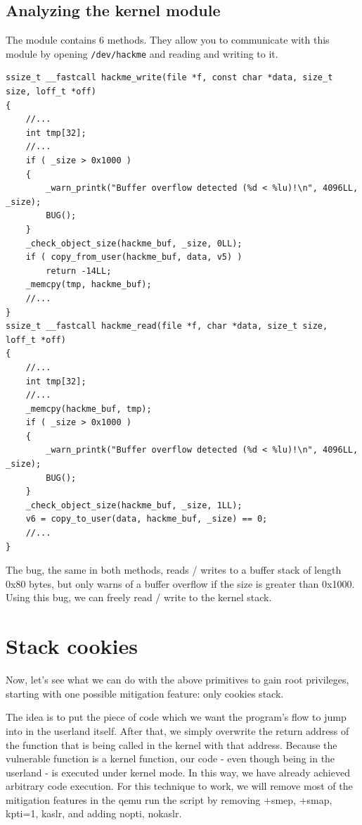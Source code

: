 \documentclass{masterthesis}
\begin{document}
\subsection{Analyzing the kernel module}
\label{subch:hackme}
The module contains 6 methods.
They allow you to communicate with this module by opening \lstinline{/dev/hackme} and reading and writing to it.
\begin{lstlisting}
ssize_t __fastcall hackme_write(file *f, const char *data, size_t size, loff_t *off)
{
    //...
    int tmp[32];
    //...
    if ( _size > 0x1000 )
    {
        _warn_printk("Buffer overflow detected (%d < %lu)!\n", 4096LL, _size);
        BUG();
    }
    _check_object_size(hackme_buf, _size, 0LL);
    if ( copy_from_user(hackme_buf, data, v5) )
        return -14LL;
    _memcpy(tmp, hackme_buf);
    //...
}
ssize_t __fastcall hackme_read(file *f, char *data, size_t size, loff_t *off)
{
    //...
    int tmp[32];
    //...
    _memcpy(hackme_buf, tmp);
    if ( _size > 0x1000 )
    {
        _warn_printk("Buffer overflow detected (%d < %lu)!\n", 4096LL, _size);
        BUG();
    }
    _check_object_size(hackme_buf, _size, 1LL);
    v6 = copy_to_user(data, hackme_buf, _size) == 0;
    //...
}
\end{lstlisting}
The bug, the same in both methods, reads / writes to a buffer stack of length 0x80 bytes, but only warns of a buffer overflow if the size is greater than 0x1000. Using this bug, we can freely read / write to the kernel stack.

\section{Stack cookies}
Now, let's see what we can do with the above primitives to gain root privileges, starting with one possible mitigation feature: only cookies stack.

The idea is to put the piece of code which we want the program’s flow to jump into in the userland itself. After that, we simply overwrite the return address of the function that is being called in the kernel with that address. Because the vulnerable function is a kernel function, our code - even though being in the userland - is executed under kernel mode. In this way, we have already achieved arbitrary code execution.
For this technique to work, we will remove most of the mitigation features in the qemu run the script by removing +smep, +smap, kpti=1, kaslr, and adding nopti, nokaslr.
\end{document}
